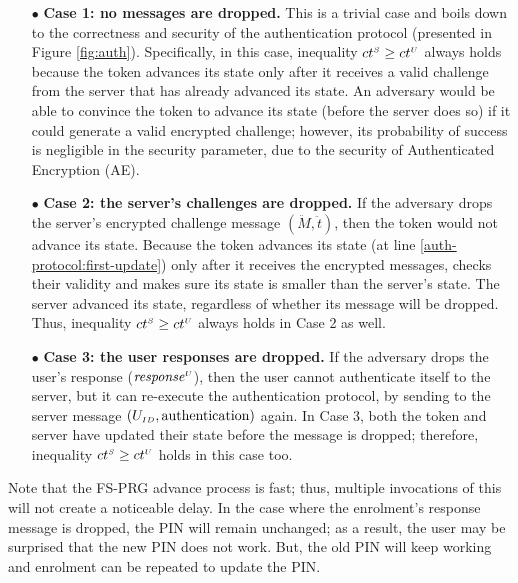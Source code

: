 \begin{itemize}
%
\item[$\bullet$] \textbf{Case 1: no messages are dropped.} This is a trivial case and boils down to the correctness and security of the authentication protocol  (presented in Figure \ref{fig:auth}). Specifically, in this case, inequality  ${ct}^{\scriptscriptstyle S} \geq {ct}^{\scriptscriptstyle U}$ always holds because the token advances its state only after it receives a valid challenge from the server that has already advanced its state. An adversary would be able to convince the token to advance its state (before the server does so) if it could generate a valid encrypted challenge; however, its probability of success is negligible in the security parameter, due to the security of Authenticated Encryption (AE). 
%
\item[$\bullet$] \textbf{Case 2: the server's challenges are dropped.} If the adversary drops the server's encrypted challenge message $(\ddot M, \ddot t)$, then the token would not advance its state. Because the token advances its state (at line \ref{auth-protocol:first-update}) only after it receives the encrypted messages, checks their validity and makes sure its state is smaller than the server's state. The server advanced its state, regardless of whether its message will be dropped. Thus, inequality  ${ct}^{\scriptscriptstyle S} \geq {ct}^{\scriptscriptstyle U}$ always holds in Case 2 as well. 
%
\item[$\bullet$] \textbf{Case 3: the user responses are dropped.} If the adversary drops the user's response (\ie $\mathit{response}^{\scriptscriptstyle U}$), then the user cannot authenticate itself to the server, but it can re-execute the authentication protocol, by sending to the server message $(U_{\scriptscriptstyle ID}, \text{authentication})$ again. In Case 3, both the token and server have updated their state before the message is dropped; therefore, inequality ${ct}^{\scriptscriptstyle S} \geq {ct}^{\scriptscriptstyle U}$  holds in this case too.   
%
\end{itemize}







Note that 
the FS-PRG advance process is fast; thus,  multiple invocations of this will not create a noticeable delay.
%
In the case where the enrolment's response message is dropped, the PIN will remain unchanged; as a result,  the user may be surprised that the new PIN does not work. But, the old PIN will keep working and enrolment can be repeated to update the PIN.
